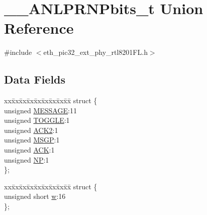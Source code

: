 \hypertarget{union_____a_n_l_p_r_n_pbits__t}{}\section{\+\_\+\+\_\+\+A\+N\+L\+P\+R\+N\+Pbits\+\_\+t Union Reference}
\label{union_____a_n_l_p_r_n_pbits__t}


{\ttfamily \#include $<$eth\+\_\+pic32\+\_\+ext\+\_\+phy\+\_\+rtl8201\+F\+L.\+h$>$}

\subsection*{Data Fields}
\begin{DoxyCompactItemize}
\item 
\begin{tabbing}
xx\=xx\=xx\=xx\=xx\=xx\=xx\=xx\=xx\=\kill
struct \{\\
\>unsigned \hyperlink{union_____a_n_l_p_r_n_pbits__t_a06361005f0d2faefe34e0bdb1499bfe7}{MESSAGE}:11\\
\>unsigned \hyperlink{union_____a_n_l_p_r_n_pbits__t_ab4110904eded0b4b6a2280a6b4b9f4c2}{TOGGLE}:1\\
\>unsigned \hyperlink{union_____a_n_l_p_r_n_pbits__t_a04eefaff71d440a3996c7db3676475ba}{ACK2}:1\\
\>unsigned \hyperlink{union_____a_n_l_p_r_n_pbits__t_a8c958300dd9e82d064f59696a78d8e45}{MSGP}:1\\
\>unsigned \hyperlink{union_____a_n_l_p_r_n_pbits__t_a9d5913829bb2b681dc6257fc7e9b7a56}{ACK}:1\\
\>unsigned \hyperlink{union_____a_n_l_p_r_n_pbits__t_ac89729be1dc289730931f8238a316516}{NP}:1\\
\}; \\

\end{tabbing}\item 
\begin{tabbing}
xx\=xx\=xx\=xx\=xx\=xx\=xx\=xx\=xx\=\kill
struct \{\\
\>unsigned short \hyperlink{union_____a_n_l_p_r_n_pbits__t_a160850a4684a3e82c2323033964f2e98}{w}:16\\
\}; \\


\end{tabbing}
\end{DoxyCompactItemize}
